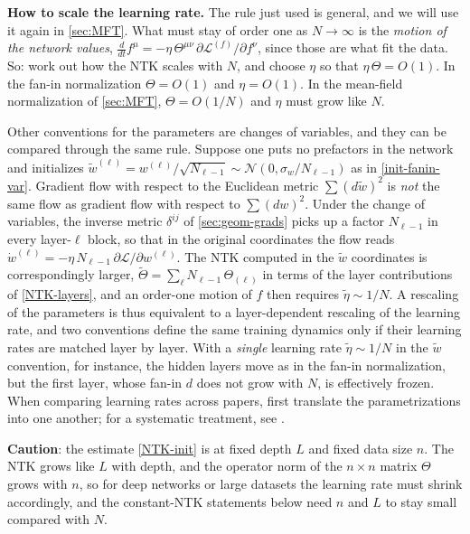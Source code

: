 \documentclass[11pt]{article}
\newcommand{\CN}{{\mathcal N}}
\newcommand{\CL}{{\mathcal L}}
\newcommand{\pd}{\partial}
\begin{document}
\begin{callout}[note]
\textbf{How to scale the learning rate.} The rule just used is general, and we will use it again in \cref{sec:MFT}. What must stay of order one as $N\to\infty$ is the \emph{motion of the network values}, $\frac{d}{dt}f^\mu = -\eta\,\Theta^{\mu\nu}\,\pd\CL^{(f)}/\pd f^\nu$, since those are what fit the data. So: work out how the NTK scales with $N$, and choose $\eta$ so that $\eta\,\Theta = O(1)$. In the fan-in normalization $\Theta = O(1)$ and $\eta = O(1)$. In the mean-field normalization of \cref{sec:MFT}, $\Theta = O(1/N)$ and $\eta$ must grow like $N$.

Other conventions for the parameters are changes of variables, and they can be compared through the same rule. Suppose one puts no prefactors in the network and initializes $\tilde w^{(\ell)} = w^{(\ell)}/\sqrt{N_{\ell-1}}\sim\CN(0,\sigma_w/N_{\ell-1})$ as in \eqref{init-fanin-var}. Gradient flow with respect to the Euclidean metric $\sum(d\tilde w)^2$ is \emph{not} the same flow as gradient flow with respect to $\sum(dw)^2$. Under the change of variables, the inverse metric $\delta^{ij}$ of \cref{sec:geom-grads} picks up a factor $N_{\ell-1}$ in every layer-$\ell$ block, so that in the original coordinates the flow reads $\dot w^{(\ell)} = -\eta\,N_{\ell-1}\,\pd\CL/\pd w^{(\ell)}$. The NTK computed in the $\tilde w$ coordinates is correspondingly larger, $\tilde\Theta = \sum_\ell N_{\ell-1}\,\Theta_{(\ell)}$ in terms of the layer contributions of \eqref{NTK-layers}, and an order-one motion of $f$ then requires $\tilde\eta\sim 1/N$. A rescaling of the parameters is thus equivalent to a layer-dependent rescaling of the learning rate, and two conventions define the same training dynamics only if their learning rates are matched layer by layer. With a \emph{single} learning rate $\tilde\eta\sim1/N$ in the $\tilde w$ convention, for instance, the hidden layers move as in the fan-in normalization, but the first layer, whose fan-in $d$ does not grow with $N$, is effectively frozen. When comparing learning rates across papers, first translate the parametrizations into one another; for a systematic treatment, see \cite{yang2021tensor}.
\end{callout}

\textbf{Caution}: the estimate \eqref{NTK-init} is at fixed depth $L$ and fixed data size $n$. The NTK grows like $L$ with depth, and the operator norm of the $n\times n$ matrix $\Theta$ grows with $n$, so for deep networks or large datasets the learning rate must shrink accordingly, and the constant-NTK statements below need $n$ and $L$ to stay small compared with $N$.
\end{document}
